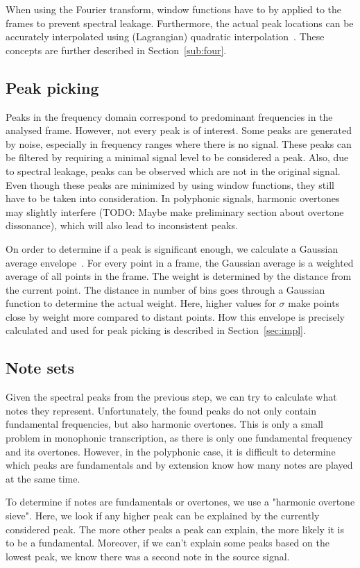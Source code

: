 \documentclass[10pt,twocolumn]{article}
\begin{document}
When using the Fourier transform, window functions have to by applied to the frames to prevent spectral leakage. Furthermore, the actual peak locations can be accurately interpolated using (Lagrangian) quadratic interpolation~\cite{interpol}. These concepts are further described in Section~\ref{sub:four}.

\subsection{Peak picking}
Peaks in the frequency domain correspond to predominant frequencies in the analysed frame. However, not every peak is of interest. Some peaks are generated by noise, especially in frequency ranges where there is no signal. These peaks can be filtered by requiring a minimal signal level to be considered a peak. Also, due to spectral leakage, peaks can be observed which are not in the original signal. Even though these peaks are minimized by using window functions, they still have to be taken into consideration. In polyphonic signals, harmonic overtones may slightly interfere (TODO: Maybe make preliminary section about overtone dissonance), which will also lead to inconsistent peaks.

On order to determine if a peak is significant enough, we calculate a Gaussian average envelope~\cite{gauss}. For every point in a frame, the Gaussian average is a weighted average of all points in the frame. The weight is determined by the distance from the current point. The distance in number of bins goes through a Gaussian function to determine the actual weight. Here, higher values for $\sigma$ make points close by weight more compared to distant points. How this envelope is precisely calculated and used for peak picking is described in Section~\ref{sec:impl}.

\subsection{Note sets}
Given the spectral peaks from the previous step, we can try to calculate what notes they represent. Unfortunately, the found peaks do not only contain fundamental frequencies, but also harmonic overtones. This is only a small problem in monophonic transcription, as there is only one fundamental frequency and its overtones. However, in the polyphonic case, it is difficult to determine which peaks are fundamentals and by extension know how many notes are played at the same time.

To determine if notes are fundamentals or overtones, we use a "harmonic overtone sieve". Here, we look if any higher peak can be explained by the currently considered peak. The more other peaks a peak can explain, the more likely it is to be a fundamental. Moreover, if we can't explain some peaks based on the lowest peak, we know there was a second note in the source signal.
\end{document}
